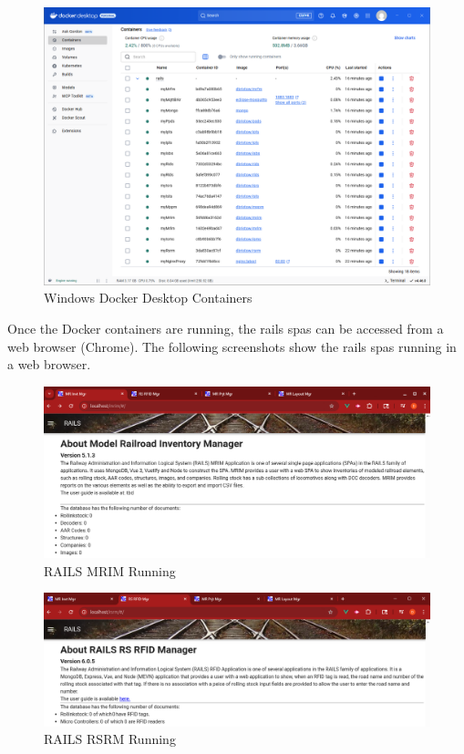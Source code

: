 \begin{figure}[H]
    \centering
    \includegraphics[scale=0.45]{../Images/docker-containers-win.png}
    \caption{Windows Docker Desktop Containers}
    \label{fig:docker-cmds-2}
\end{figure}
Once the Docker containers are running, the \gls{rails} \glspl{spa} can be accessed from a web browser (Chrome). The following screenshots show the \gls{rails} \glspl{spa} running in a web browser.
\begin{figure}[H]
    \centering
    \includegraphics[scale=0.33]{../Images/mrim-home-0.png}
    \caption{RAILS MRIM Running}
    \label{fig:rails-mrim}
\end{figure}
\begin{figure}[H]
    \centering
    \includegraphics[scale=0.33]{../Images/rsrm-home.png}
    \caption{RAILS RSRM Running}
    \label{fig:rails-rsrm}
\end{figure}
